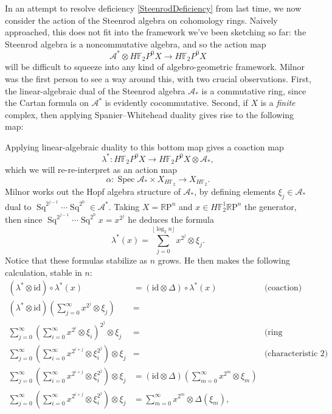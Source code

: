 \documentclass{article}
\newcommand{\F}{\mathbb F}
\newcommand{\R}{\mathbb R}
\newcommand{\RP}{\R\mathrm P}
\newcommand{\<}{\langle}
\renewcommand{\>}{\rangle}
\newcommand{\id}{\mathrm{id}}
\DeclareMathOperator{\Spec}{Spec}
\DeclareMathOperator{\Sq}{Sq}
\numberwithin{equation}{section}
\theoremstyle{plain}
\theoremstyle{definition}
\theoremstyle{remark}
\begin{document}
In an attempt to resolve deficiency \ref{SteenrodDeficiency} from last time, we now consider the action of the Steenrod algebra on cohomology rings.  Naively approached, this does not fit into the framework we've been sketching so far: the Steenrod algebra is a noncommutative algebra, and so the action map \[\mathcal A^* \otimes H\F_2P^0 X \to H\F_2P^0 X\] will be difficult to squeeze into any kind of algebro-geometric framework.  Milnor was the first person to see a way around this, with two crucial observations.  First, the linear-algebraic dual of the Steenrod algebra $\mathcal A_*$ is a commutative ring, since the Cartan formula on $\mathcal A^*$ is evidently cocommutative.  Second, if $X$ is a \emph{finite} complex, then applying Spanier--Whitehead duality gives rise to the following map:
\begin{center}
\end{center}
Applying linear-algebraic duality to this bottom map gives a coaction map \[\lambda^*: H\F_2P^0 X \to H\F_2P^0 X \otimes \mathcal A_*,\] which we will re-re-interpret as an action map \[\alpha: \Spec \mathcal A_* \times X_{H\F_2} \to X_{H\F_2}.\]  Milnor works out the Hopf algebra structure of $\mathcal A_*$, by defining elements $\xi_j \in \mathcal A_*$ dual to $\Sq^{2^{j-1}} \cdots \Sq^{2^0} \in \mathcal A^*$.  Taking $X = \RP^n$ and $x \in H\F_2^1 \RP^n$ the generator, then since $\Sq^{2^{j-1}} \cdots \Sq^{2^0} x = x^{2^j}$ he deduces the formula \[\lambda^*(x) = \sum_{j=0}^{\lfloor \log_2 n \rfloor} x^{2^j} \otimes \xi_j.\]  Notice that these formulas stabilize as $n$ grows.  He then makes the following calculation, stable in $n$:
\begin{align*}
(\lambda^* \otimes \id) \circ \lambda^*(x) & = (\id \otimes \Delta) \circ \lambda^*(x) & \text{(coaction)} \\
(\lambda^* \otimes \id) \left( \sum_{j=0}^\infty x^{2^j} \otimes \xi_j \right) & = \\
\sum_{j=0}^\infty \left( \sum_{i=0}^\infty x^{2^i} \otimes \xi_i \right)^{2^j} \otimes \xi_j & = & \text{(ring homomorphism)} \\
\sum_{j=0}^\infty \left( \sum_{i=0}^\infty x^{2^{i+j}} \otimes \xi_i^{2^j} \right) \otimes \xi_j & = & \text{(characteristic $2$)} \\
\sum_{j=0}^\infty \left( \sum_{i=0}^\infty x^{2^{i+j}} \otimes \xi_i^{2^j} \right) \otimes \xi_j & = (\id \otimes \Delta) \left( \sum_{m=0}^\infty x^{2^m} \otimes \xi_m \right) \\
\sum_{j=0}^\infty \left( \sum_{i=0}^\infty x^{2^{i+j}} \otimes \xi_i^{2^j} \right) \otimes \xi_j & = \sum_{m=0}^\infty x^{2^m} \otimes \Delta(\xi_m),
\end{align*}
\end{document}
